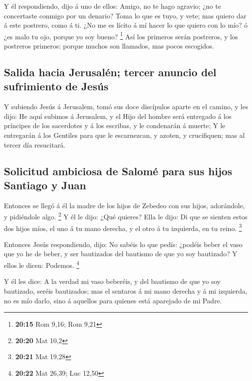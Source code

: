  Y él respondiendo, dijo á uno de ellos: Amigo, no te hago
agravio; ¿no te concertaste conmigo por un denario?  Toma
lo que es tuyo, y vete; mas quiero dar á este postrero, como á ti.
 ¿No me es lícito á mí hacer lo que quiero con lo mío? ó
¿es malo tu ojo, porque yo soy bueno? \footnote{\textbf{20:15} Rom 9,16;
  Rom 9,21}  Así los primeros serán postreros, y los
postreros primeros: porque muchos son llamados, mas pocos escogidos.

\hypertarget{salida-hacia-jerusaluxe9n-tercer-anuncio-del-sufrimiento-de-jesuxfas}{%
\subsection{Salida hacia Jerusalén; tercer anuncio del sufrimiento de
Jesús}\label{salida-hacia-jerusaluxe9n-tercer-anuncio-del-sufrimiento-de-jesuxfas}}

 Y subiendo Jesús á Jerusalem, tomó sus doce discípulos
aparte en el camino, y les dijo:  He aquí subimos á
Jerusalem, y el Hijo del hombre será entregado á los príncipes de los
sacerdotes y á los escribas, y le condenarán á muerte;  Y
le entregarán á los Gentiles para que le escarnezcan, y azoten, y
crucifiquen; mas al tercer día resucitará.

\hypertarget{solicitud-ambiciosa-de-salomuxe9-para-sus-hijos-santiago-y-juan}{%
\subsection{Solicitud ambiciosa de Salomé para sus hijos Santiago y
Juan}\label{solicitud-ambiciosa-de-salomuxe9-para-sus-hijos-santiago-y-juan}}

 Entonces se llegó á él la madre de los hijos de Zebedeo
con sus hijos, adorándole, y pidiéndole algo. \footnote{\textbf{20:20}
  Mat 10,2}  Y él le dijo: ¿Qué quieres? Ella le dijo: Di
que se sienten estos dos hijos míos, el uno á tu mano derecha, y el otro
á tu izquierda, en tu reino. \footnote{\textbf{20:21} Mat 19,28}

 Entonces Jesús respondiendo, dijo: No sabéis lo que pedís:
¿podéis beber el vaso que yo he de beber, y ser bautizados del bautismo
de que yo soy bautizado? Y ellos le dicen: Podemos. \footnote{\textbf{20:22}
  Mat 26,39; Luc 12,50}

 Y él les dice: A la verdad mi vaso beberéis, y del
bautismo de que yo soy bautizado, seréis bautizados; mas el sentaros á
mi mano derecha y á mi izquierda, no es mío darlo, sino á aquellos para
quienes está aparejado de mi Padre.

